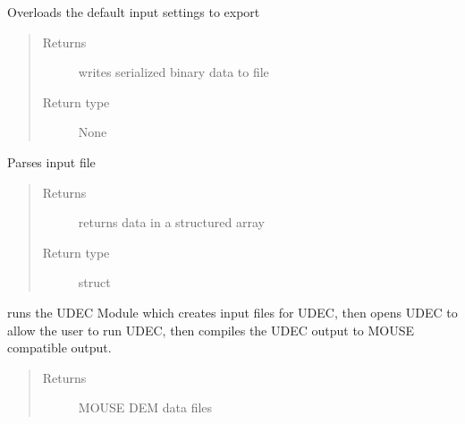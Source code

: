 \documentclass[letterpaper,10pt,english]{sphinxmanual}
\begin{document}
\begin{fulllineitems}
\begin{fulllineitems}
\end{fulllineitems}


\begin{fulllineitems}
\label{\detokenize{MouseReferenceManual:Modules.Module_UDEC.Module_UDEC.outputFileName}}
Overloads the default input settings to export
\begin{quote}\begin{description}
\item[{Returns}] \leavevmode
writes serialized binary data to file

\item[{Return type}] \leavevmode
None

\end{description}\end{quote}

\end{fulllineitems}


\begin{fulllineitems}
\label{\detokenize{MouseReferenceManual:Modules.Module_UDEC.Module_UDEC.parseInput}}
Parses input file
\begin{quote}\begin{description}
\item[{Returns}] \leavevmode
returns data in a structured array

\item[{Return type}] \leavevmode
struct

\end{description}\end{quote}

\end{fulllineitems}


\begin{fulllineitems}
\label{\detokenize{MouseReferenceManual:Modules.Module_UDEC.Module_UDEC.run}}
runs the UDEC Module which creates input files for UDEC, then opens UDEC to allow the user to run UDEC, then compiles the UDEC output to MOUSE compatible output.
\begin{quote}\begin{description}
\item[{Returns}] \leavevmode
MOUSE DEM data files


\end{description}
\end{quote}
\end{fulllineitems}
\end{fulllineitems}
\end{document}

